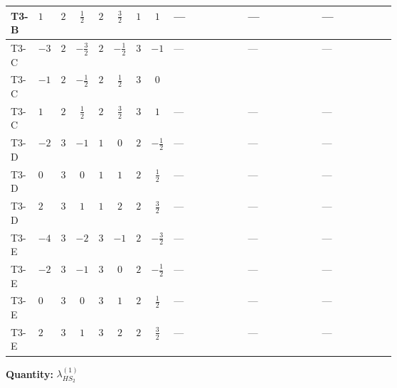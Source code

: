 \documentclass[8pt]{article}
\begin{document}
\begin{landscape}
\begin{longtable}{@{}llcccccc >{\raggedright\arraybackslash}p{0.21\linewidth} >{\raggedright\arraybackslash}p{0.21\linewidth} >{\raggedright\arraybackslash}p{0.21\linewidth}@{}}
\midrule
T3-B & $1$ & $2$ & $\frac{1}{2}$ & $2$ & $\frac{3}{2}$ & $1$ & $1$ & --- & --- & --- \\
\midrule
T3-C & $-3$ & $2$ & $-\frac{3}{2}$ & $2$ & $-\frac{1}{2}$ & $3$ & $-1$ & --- & --- & --- \\
\midrule
T3-C & $-1$ & $2$ & $-\frac{1}{2}$ & $2$ & $\frac{1}{2}$ & $3$ & $0$ & \scriptsize\adjustbox{max width=\linewidth}{$\begin{gathered} +3 {\lambda_{10}} \left({\lambda_{H H^\dagger S_1^\dagger S_2^\dagger}^{\rm Cross}}\right)^{*}\end{gathered}$} & \scriptsize\adjustbox{max width=\linewidth}{$\begin{gathered} +{\lambda_{H H^\dagger S_1^\dagger S_2^\dagger}^{\rm Cross}} (4 \left({\lambda_{H H^\dagger S_1^\dagger S_2^\dagger}^{\rm Cross}}\right)^{*}+3 \left({\lambda_{10}}\right)^{*})\end{gathered}$} & \scriptsize\adjustbox{max width=\linewidth}{$\begin{gathered} +24 {\lambda_{8}} \left({\lambda_{8}}\right)^{*}\end{gathered}$} \\
\midrule
T3-C & $1$ & $2$ & $\frac{1}{2}$ & $2$ & $\frac{3}{2}$ & $3$ & $1$ & --- & --- & --- \\
\midrule
T3-D & $-2$ & $3$ & $-1$ & $1$ & $0$ & $2$ & $-\frac{1}{2}$ & --- & --- & --- \\
\midrule
T3-D & $0$ & $3$ & $0$ & $1$ & $1$ & $2$ & $\frac{1}{2}$ & --- & --- & --- \\
\midrule
T3-D & $2$ & $3$ & $1$ & $1$ & $2$ & $2$ & $\frac{3}{2}$ & --- & --- & --- \\
\midrule
T3-E & $-4$ & $3$ & $-2$ & $3$ & $-1$ & $2$ & $-\frac{3}{2}$ & --- & --- & --- \\
\midrule
T3-E & $-2$ & $3$ & $-1$ & $3$ & $0$ & $2$ & $-\frac{1}{2}$ & --- & --- & --- \\
\midrule
T3-E & $0$ & $3$ & $0$ & $3$ & $1$ & $2$ & $\frac{1}{2}$ & --- & --- & --- \\
\midrule
T3-E & $2$ & $3$ & $1$ & $3$ & $2$ & $2$ & $\frac{3}{2}$ & --- & --- & --- \\
\midrule
\bottomrule
\end{longtable}
\clearpage
\noindent\textbf{Quantity: }$\lambda_{HS_2}^{(1)}$\par\smallskip

\end{landscape}
\end{document}
